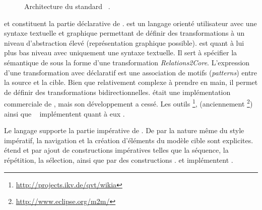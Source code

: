 \begin{figure}[h]
  \centering
  
  \caption{Architecture du standard {\qvt}~\cite{omgqvt1}.}
  \label{fig:qvt}
\end{figure}
{\qvtr} et {\qvtc} constituent la partie déclarative de {\qvt}. {\qvtr} est un
langage orienté utilisateur avec une syntaxe textuelle et graphique permettant
de définir des transformations à un niveau d'abstraction élevé (représentation
graphique possible). {\qvtc} est quant à lui plus bas niveau avec uniquement
une syntaxe textuelle. Il sert à spécifier la sémantique de {\qvtr} sous la
forme d'une transformation \emph{Relations2Core}. L'expression d'une
transformation avec {\qvt} déclaratif est une association de motifs
(\emph{patterns}) entre la source et la cible. Bien que relativement complexe à
prendre en main, il permet de définir des transformations bidirectionnelles.
{\optimalj} était une implémentation commerciale de {\qvtc}, mais son
développement a cessé. Les outils
{\mediniqvt}\footnote{\url{http://projects.ikv.de/qvt/wikia}}, {\eclipsemmt}
(anciennement {\eclipsemtom}\footnote{\url{http://www.eclipse.org/m2m/}}) ainsi
que {\moment}~\cite{Boronat2009} implémentent quant à eux {\qvtr}.

Le langage {\qvto} supporte la partie impérative de {\qvt}. De par la nature
même du style impératif, la navigation et la création d'éléments du modèle
cible sont explicites. {\qvto} étend {\qvtr} et {\qvtc} par ajout de
constructions impératives telles que la séquence, la répétition, la sélection,
{\etc} ainsi que par des constructions {\ocl}. {\smartqvt} et
{\eclipsemmtoqvt} implémentent {\qvto}.


